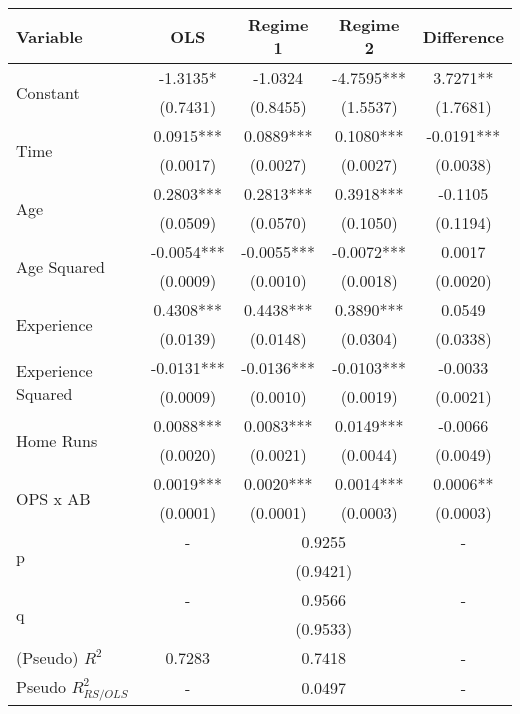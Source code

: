 \documentclass[12pt]{article}
\begin{document}
\begin{table}
\begin{center}
\begin{tabular}{l|c|cc|c} 
 Variable & OLS & Regime 1 & Regime 2 & Difference \\ \hline 

 \multirow{2}{*}{Constant} & -1.3135* & -1.0324  & -4.7595*** & 3.7271** \\ 
 & (0.7431) & (0.8455) & (1.5537) & (1.7681) \\ [0.4pc]
 \multirow{2}{*}{Time} & 0.0915*** & 0.0889*** & 0.1080*** & -0.0191*** \\ 
 & (0.0017) & (0.0027) & (0.0027) & (0.0038) \\ [0.4pc]
 \multirow{2}{*}{Age} & 0.2803*** & 0.2813*** & 0.3918*** & -0.1105  \\ 
 & (0.0509) & (0.0570) & (0.1050) & (0.1194) \\ [0.4pc]
 \multirow{2}{*}{Age Squared} & -0.0054*** & -0.0055*** & -0.0072*** & 0.0017  \\ 
 & (0.0009) & (0.0010) & (0.0018) & (0.0020) \\ [0.4pc]
 \multirow{2}{*}{Experience} & 0.4308*** & 0.4438*** & 0.3890*** & 0.0549  \\ 
 & (0.0139) & (0.0148) & (0.0304) & (0.0338) \\ [0.4pc]
 \multirow{2}{*}{Experience Squared} & -0.0131*** & -0.0136*** & -0.0103*** & -0.0033  \\ 
 & (0.0009) & (0.0010) & (0.0019) & (0.0021) \\ [0.4pc]
 \multirow{2}{*}{Home Runs} & 0.0088*** & 0.0083*** & 0.0149*** & -0.0066  \\ 
 & (0.0020) & (0.0021) & (0.0044) & (0.0049) \\ [0.4pc]
 \multirow{2}{*}{OPS x AB} & 0.0019*** & 0.0020*** & 0.0014*** & 0.0006** \\ 
 & (0.0001) & (0.0001) & (0.0003) & (0.0003) \\ [0.4pc]\hline 
\multirow{2}{*}{p} & - & \multicolumn{2}{c|}{0.9255} & - \\ 
 & & \multicolumn{2}{c|}{(0.9421)} & \\ [0.4pc] 
\multirow{2}{*}{q} & - & \multicolumn{2}{c|}{0.9566} & - \\ 
 & & \multicolumn{2}{c|}{(0.9533)} & \\ \hline 
(Pseudo) $R^2$ & 0.7283 & \multicolumn{2}{c|}{0.7418} & - \\ 
Pseudo $R_{RS/OLS}^2$ & - & \multicolumn{2}{c|}{0.0497} & - \\ \hline
\end{tabular}
\end{center}
\end{table}
\end{document}
